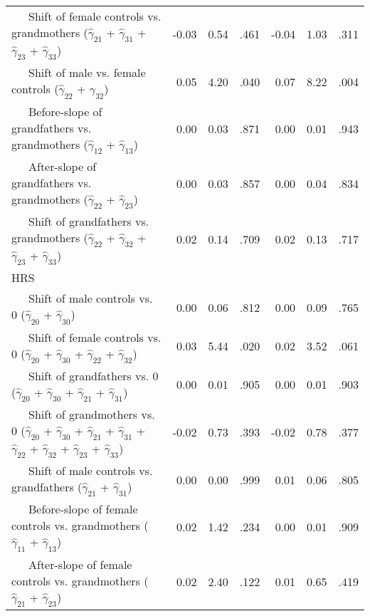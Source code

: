 \documentclass[
  english,
  man, noextraspace]{apa7}
\newenvironment{lltable}{\begin{landscape}\begin{center}\begin{ThreePartTable}}{\end{ThreePartTable}\end{center}\end{landscape}}
\begin{document}
\begin{appendix}
\begin{lltable}
{\begin{longtable}{lrrrrrr}
\ \ \ Shift of female controls vs. grandmothers 
($\hat{\gamma}_{21}$ + $\hat{\gamma}_{31}$ + 
$\hat{\gamma}_{23}$ + $\hat{\gamma}_{33}$) \textcolor{white}{L} & -0.03 & 0.54 & .461 & -0.04 & 1.03 & .311\\
\ \ \ Shift of male vs. female controls 
($\hat{\gamma}_{22}$ + $\hat{\gamma}_{32}$) \textcolor{white}{L} & 0.05 & 4.20 & .040 & 0.07 & 8.22 & .004\\
\ \ \ Before-slope of grandfathers vs. grandmothers 
($\hat{\gamma}_{12}$ + $\hat{\gamma}_{13}$) \textcolor{white}{L} & 0.00 & 0.03 & .871 & 0.00 & 0.01 & .943\\
\ \ \ After-slope of grandfathers vs. grandmothers 
($\hat{\gamma}_{22}$ + $\hat{\gamma}_{23}$) \textcolor{white}{L} & 0.00 & 0.03 & .857 & 0.00 & 0.04 & .834\\
\ \ \ Shift of grandfathers vs. grandmothers 
($\hat{\gamma}_{22}$ + $\hat{\gamma}_{32}$ + 
$\hat{\gamma}_{23}$ + $\hat{\gamma}_{33}$) \textcolor{white}{L} & 0.02 & 0.14 & .709 & 0.02 & 0.13 & .717\\
HRS &  &  &  &  &  & \\
\ \ \ Shift of male controls vs. 0 ($\hat{\gamma}_{20}$ + 
$\hat{\gamma}_{30}$) \textcolor{white}{H} & 0.00 & 0.06 & .812 & 0.00 & 0.09 & .765\\
\ \ \ Shift of female controls vs. 0 ($\hat{\gamma}_{20}$ + 
$\hat{\gamma}_{30}$ + $\hat{\gamma}_{22}$ + 
$\hat{\gamma}_{32}$) \textcolor{white}{H} & 0.03 & 5.44 & .020 & 0.02 & 3.52 & .061\\
\ \ \ Shift of grandfathers vs. 0 ($\hat{\gamma}_{20}$ + 
$\hat{\gamma}_{30}$ + $\hat{\gamma}_{21}$ + 
$\hat{\gamma}_{31}$) \textcolor{white}{H} & 0.00 & 0.01 & .905 & 0.00 & 0.01 & .903\\
\ \ \ Shift of grandmothers vs. 0 ($\hat{\gamma}_{20}$ + 
$\hat{\gamma}_{30}$ + $\hat{\gamma}_{21}$ + 
$\hat{\gamma}_{31}$ + $\hat{\gamma}_{22}$ + 
$\hat{\gamma}_{32}$ + $\hat{\gamma}_{23}$ +
$\hat{\gamma}_{33}$) \textcolor{white}{H} & -0.02 & 0.73 & .393 & -0.02 & 0.78 & .377\\
\ \ \ Shift of male controls vs. grandfathers 
($\hat{\gamma}_{21}$ + $\hat{\gamma}_{31}$) \textcolor{white}{H} & 0.00 & 0.00 & .999 & 0.01 & 0.06 & .805\\
\ \ \ Before-slope of female controls vs. grandmothers 
($\hat{\gamma}_{11}$ + $\hat{\gamma}_{13}$) \textcolor{white}{H} & 0.02 & 1.42 & .234 & 0.00 & 0.01 & .909\\
\ \ \ After-slope of female controls vs. grandmothers 
($\hat{\gamma}_{21}$ + $\hat{\gamma}_{23}$) \textcolor{white}{H} & 0.02 & 2.40 & .122 & 0.01 & 0.65 & .419\\

\end{longtable}}
\end{lltable}
\end{appendix}
\end{document}
